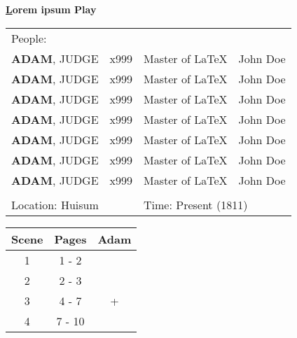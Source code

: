 \documentclass[10pt]{article}
\newcommand{\PlayTitle}{Lorem ipsum Play}
\newcommand{\TitlePageLineBold}[3]{\fontsize{#1}{#2}\selectfont \textbf{#3} \par}
\begin{document}
\begin{titlepage}
\begin{flushleft}
\TitlePageLineBold{26pt}{26pt}{\ul\PlayTitle}
\vspace{0.5cm}

\begin{table}[H] %
\begin{tabular}{p{4cm} p{5cm} p{3cm} p{2cm}}
People:& & & \\
\textbf{ADAM}, JUDGE & x999 & Master of LaTeX & John Doe \\
\textbf{ADAM}, JUDGE & x999 & Master of LaTeX & John Doe \\
\textbf{ADAM}, JUDGE & x999 & Master of LaTeX & John Doe \\
\textbf{ADAM}, JUDGE & x999 & Master of LaTeX & John Doe \\
\textbf{ADAM}, JUDGE & x999 & Master of LaTeX & John Doe \\
\textbf{ADAM}, JUDGE & x999 & Master of LaTeX & John Doe \\
\textbf{ADAM}, JUDGE & x999 & Master of LaTeX & John Doe \\
& & & \\
\multicolumn{2}{l}{Location: Huisum} &\multicolumn{2}{l}{Time: Present (1811)} \\

\end{tabular}
\end{table}


\begin{table}[H] %
\begin{tabular}{|c|c|c|}
\hline
Scene & Pages & Adam \\ \hline
1 & 1 - 2 & \cellcolor{TableColorAppearance} \\ \hline
2 & 2 - 3 & \\ \hline
3 & 4 - 7 & \cellcolor{TableColorSemiAppearance} + \\ \hline
4 & 7 - 10 & \\ \hline

\end{tabular}
\end{table}

\end{flushleft}
\end{titlepage}
\end{document}
